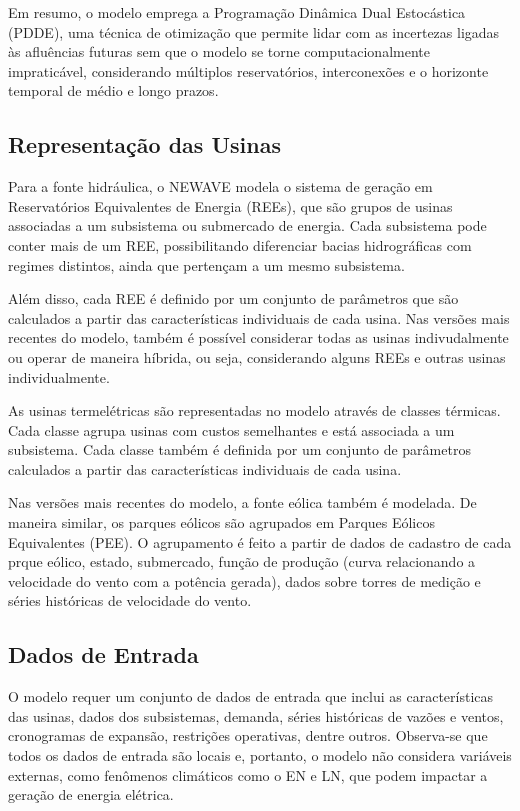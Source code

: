 Em resumo, o modelo emprega a Programação Dinâmica Dual Estocástica (PDDE), uma técnica de otimização que permite lidar 
com as incertezas ligadas às afluências futuras sem que o modelo se torne computacionalmente impraticável, considerando 
múltiplos reservatórios, interconexões e o horizonte temporal de médio e longo prazos.

\subsection{Representação das Usinas}
Para a fonte hidráulica, o NEWAVE modela o sistema de geração em Reservatórios Equivalentes de Energia (REEs), que são grupos de
usinas associadas a um subsistema ou submercado de energia. Cada subsistema pode conter mais de um REE, possibilitando
diferenciar bacias hidrográficas com regimes distintos, ainda que pertençam a um mesmo subsistema. 

Além disso, cada REE é definido por um conjunto de parâmetros que são calculados a partir das características individuais 
de cada usina. Nas versões mais recentes do modelo, também é possível considerar todas as usinas indivudalmente ou operar
de maneira híbrida, ou seja, considerando alguns REEs e outras usinas individualmente.

As usinas termelétricas são representadas no modelo através de classes térmicas. Cada classe agrupa usinas com custos 
semelhantes e está associada a um subsistema. Cada classe também é definida por um conjunto de parâmetros calculados
a partir das características individuais de cada usina.

Nas versões mais recentes do modelo, a fonte eólica também é modelada. De maneira similar, os parques eólicos são agrupados
em Parques Eólicos Equivalentes (PEE). O agrupamento é feito a partir de dados de cadastro de cada prque eólico, estado,
submercado, função de produção (curva relacionando a velocidade do vento com a potência gerada), dados sobre torres de
medição e séries históricas de velocidade do vento.

\subsection{Dados de Entrada}
O modelo requer um conjunto de dados de entrada que inclui as características das usinas, dados dos subsistemas, demanda,
séries históricas de vazões e ventos, cronogramas de expansão, restrições operativas, dentre outros. Observa-se
que todos os dados de entrada são locais e, portanto, o modelo não considera variáveis externas, como fenômenos climáticos
como o EN e LN, que podem impactar a geração de energia elétrica. 

